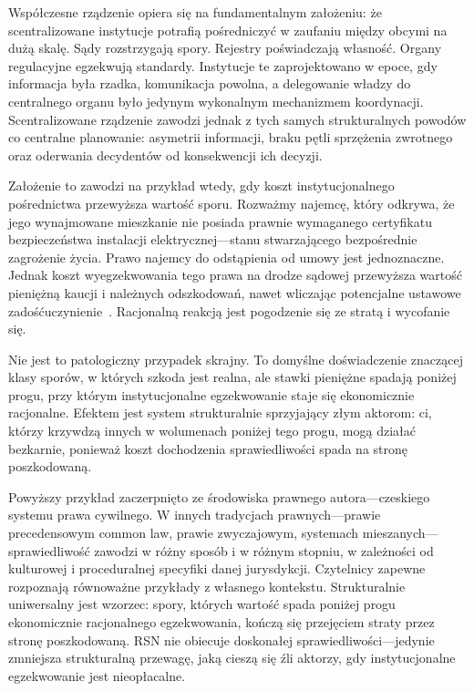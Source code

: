 \documentclass[11pt,a4paper,twocolumn]{article}
\begin{document}
Współczesne rządzenie opiera się na fundamentalnym założeniu: że scentralizowane instytucje potrafią pośredniczyć w zaufaniu między obcymi na dużą skalę. Sądy rozstrzygają spory. Rejestry poświadczają własność. Organy regulacyjne egzekwują standardy. Instytucje te zaprojektowano w epoce, gdy informacja była rzadka, komunikacja powolna, a delegowanie władzy do centralnego organu było jedynym wykonalnym mechanizmem koordynacji. Scentralizowane rządzenie zawodzi jednak z tych samych strukturalnych powodów co centralne planowanie: asymetrii informacji, braku pętli sprzężenia zwrotnego oraz oderwania decydentów od konsekwencji ich decyzji.

Założenie to zawodzi na przykład wtedy, gdy koszt instytucjonalnego pośrednictwa przewyższa wartość sporu. Rozważmy najemcę, który odkrywa, że jego wynajmowane mieszkanie nie posiada prawnie wymaganego certyfikatu bezpieczeństwa instalacji elektrycznej---stanu stwarzającego bezpośrednie zagrożenie życia. Prawo najemcy do odstąpienia od umowy jest jednoznaczne. Jednak koszt wyegzekwowania tego prawa na drodze sądowej przewyższa wartość pieniężną kaucji i należnych odszkodowań, nawet wliczając potencjalne ustawowe zadośćuczynienie~\cite{czcourtfees}. Racjonalną reakcją jest pogodzenie się ze stratą i wycofanie się.

Nie jest to patologiczny przypadek skrajny. To domyślne doświadczenie znaczącej klasy sporów, w których szkoda jest realna, ale stawki pieniężne spadają poniżej progu, przy którym instytucjonalne egzekwowanie staje się ekonomicznie racjonalne. Efektem jest system strukturalnie sprzyjający złym aktorom: ci, którzy krzywdzą innych w wolumenach poniżej tego progu, mogą działać bezkarnie, ponieważ koszt dochodzenia sprawiedliwości spada na stronę poszkodowaną.

Powyższy przykład zaczerpnięto ze środowiska prawnego autora---czeskiego systemu prawa cywilnego. W innych tradycjach prawnych---prawie precedensowym common law, prawie zwyczajowym, systemach mieszanych---sprawiedliwość zawodzi w różny sposób i w różnym stopniu, w zależności od kulturowej i proceduralnej specyfiki danej jurysdykcji. Czytelnicy zapewne rozpoznają równoważne przykłady z własnego kontekstu. Strukturalnie uniwersalny jest wzorzec: spory, których wartość spada poniżej progu ekonomicznie racjonalnego egzekwowania, kończą się przejęciem straty przez stronę poszkodowaną. RSN nie obiecuje doskonałej sprawiedliwości---jedynie zmniejsza strukturalną przewagę, jaką cieszą się źli aktorzy, gdy instytucjonalne egzekwowanie jest nieopłacalne.
\end{document}
